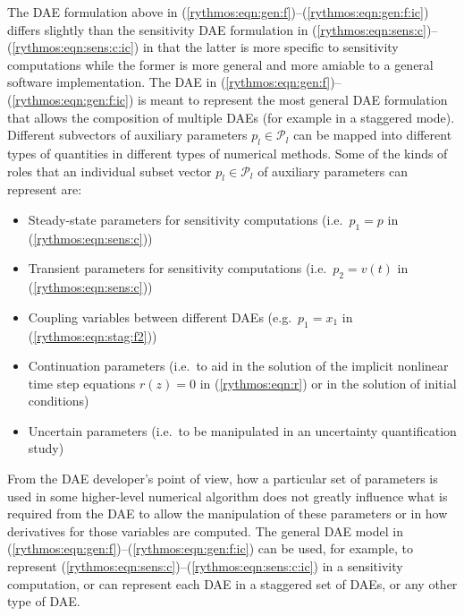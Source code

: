 \documentclass[pdf,ps2pdf,11pt]{SANDreport}
\begin{document}
The DAE formulation above in
(\ref{rythmos:eqn:gen:f})--(\ref{rythmos:eqn:gen:f:ic}) differs slightly than
the sensitivity DAE formulation in
(\ref{rythmos:eqn:sens:c})--(\ref{rythmos:eqn:sens:c:ic}) in that the latter
is more specific to sensitivity computations while the former is more general
and more amiable to a general software implementation.  The DAE in
(\ref{rythmos:eqn:gen:f})--(\ref{rythmos:eqn:gen:f:ic}) is meant to represent
the most general DAE formulation that allows the composition of multiple DAEs
(for example in a staggered mode).  Different subvectors of auxiliary
parameters $p_l\in\mathcal{P}_l$ can be mapped into different types of
quantities in different types of numerical methods.  Some of the kinds of
roles that an individual subset vector $p_l\in\mathcal{P}_l$ of auxiliary
parameters can represent are:
%
\begin{itemize}
%
{}\item Steady-state parameters for sensitivity computations (i.e.\ $p_1 =
p$ in (\ref{rythmos:eqn:sens:c}))
%
{}\item Transient parameters for sensitivity computations (i.e.\ $p_2 = v(t)$
in (\ref{rythmos:eqn:sens:c}))
%
{}\item Coupling variables between different DAEs (e.g.\ $p_1 = x_1$ in
(\ref{rythmos:eqn:stag:f2}))
%
{}\item Continuation parameters (i.e.\ to aid in the solution of the implicit
nonlinear time step equations $r(z)=0$ in (\ref{rythmos:eqn:r}) or in the
solution of initial conditions)
%
{}\item Uncertain parameters (i.e.\ to be manipulated in an uncertainty
quantification study)
%
\end{itemize}

From the DAE developer's point of view, how a particular set of parameters is
used in some higher-level numerical algorithm does not greatly influence what
is required from the DAE to allow the manipulation of these parameters or in
how derivatives for those variables are computed.  The general DAE model in
(\ref{rythmos:eqn:gen:f})--(\ref{rythmos:eqn:gen:f:ic}) can be used, for
example, to represent
(\ref{rythmos:eqn:sens:c})--(\ref{rythmos:eqn:sens:c:ic}) in a sensitivity
computation, or can represent each DAE in a staggered set of DAEs, or any
other type of DAE.
\end{document}
